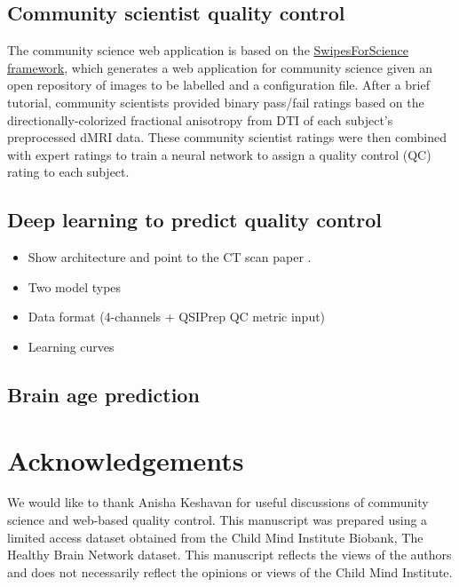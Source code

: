 \documentclass[fleqn,10pt]{wlscirep}
\begin{document}

\subsection*{Community scientist quality control}

The community science web application is based on the
\href{https://swipesforscience.org/}{SwipesForScience framework}, which
generates a web application for community science given an open repository of
images to be labelled and a configuration file.
After a brief tutorial, community scientists provided binary pass/fail ratings
based on the directionally-colorized fractional anisotropy from DTI of each
subject's preprocessed dMRI data. These community scientist ratings were then
combined with expert ratings to train a neural network to assign a quality
control (QC) rating to each subject.

\subsection*{Deep learning to predict quality control}

\begin{itemize}
    \item Show architecture and point to the CT scan paper \cite{zunair2020-bs}.
    \item Two model types
    \item Data format (4-channels + QSIPrep QC metric input)
    \item Learning curves
\end{itemize}

\subsection*{Brain age prediction}



\section*{Acknowledgements}

We would like to thank Anisha Keshavan for useful discussions of community
science and web-based quality control. This manuscript was prepared using a
limited access dataset obtained from the Child Mind Institute Biobank, The
Healthy Brain Network dataset. This manuscript reflects the views of the authors
and does not necessarily reflect the opinions or views of the Child Mind
Institute.
\end{document}
